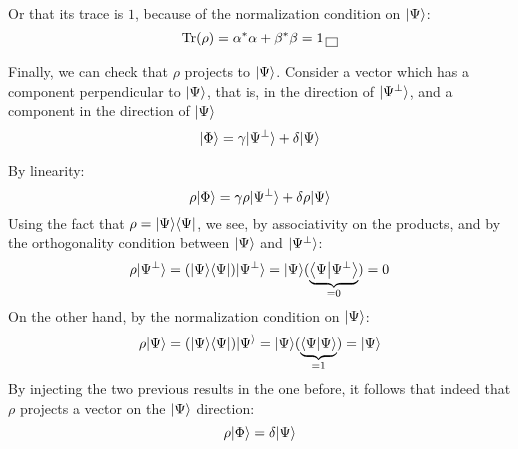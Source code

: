 \documentclass[solutions.tex]{subfiles}
\begin{document}
Or that its trace is $1$, because of the normalization condition
on $|\Psi\rangle$:
\[
	\text{Tr}(\rho) = \alpha^*\alpha + \beta^*\beta = 1 \,\boxed{\,}
\]

Finally, we can check that $\rho$ projects to $|\Psi\rangle$. Consider
a vector which has a component perpendicular to $|\Psi\rangle$, that is,
in the direction of $|\Psi^\perp\rangle$, and a component
in the direction of $|\Psi\rangle$
\[
	|\Phi\rangle = \gamma|\Psi^\perp\rangle + \delta|\Psi\rangle
\]

By linearity:
\[
	\rho|\Phi\rangle = \gamma\rho|\Psi^\perp\rangle + \delta\rho|\Psi\rangle
\]
Using the fact that $\rho = |\Psi\rangle\langle \Psi|$, we see, by associativity
on the products, and by the orthogonality condition between $|\Psi\rangle$
and $|\Psi^\perp\rangle$:
\[
	\rho|\Psi^\perp\rangle = (|\Psi\rangle\langle \Psi|)|\Psi^\perp\rangle
		= |\Psi\rangle(\underbrace{\left\langle \Psi \middle| \Psi^\perp \right\rangle}_{=0}) = 0
\]
On the other hand, by the normalization condition on $|\Psi\rangle$:
\[
	\rho|\Psi\rangle = (|\Psi\rangle\langle \Psi|)|\Psi^\rangle
		= |\Psi\rangle(\underbrace{\left\langle \Psi \middle| \Psi \right\rangle}_{=1}) = |\Psi\rangle
\]
By injecting the two previous results in the one before, it follows that
indeed that $\rho$ projects a vector on the $|\Psi\rangle$ direction:
\[
	\rho|\Phi\rangle = \delta|\Psi\rangle
\]
\end{document}

